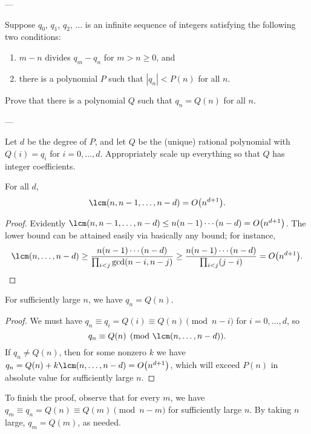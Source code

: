 
---

Suppose $q_0$, $q_1$, $q_2$, $\ldots$ is an infinite sequence of integers satisfying the following two conditions:
\begin{enumerate}[label=(\roman*),itemsep=0em]
    \item $m-n$ divides $q_m-q_n$ for $m>n\ge0$, and
    \item there is a polynomial $P$ such that $|q_n|<P(n)$ for all $n$.
\end{enumerate}
Prove that there is a polynomial $Q$ such that $q_n=Q(n)$ for all $n$.

---

Let $d$ be the degree of $P$, and let $Q$ be the (unique) rational polynomial with $Q(i)=q_i$ for $i=0,\ldots,d$. Appropriately scale up everything so that $Q$ has integer coefficients.
\begin{lemma*}
    For all $d$,
    \[\lcm(n,n-1,\ldots,n-d)=O\big(n^{d+1}\big).\]
\end{lemma*}
\begin{proof}
    Evidently $\lcm(n,n-1,\ldots,n-d)\le n(n-1)\cdots(n-d)=O\big(n^{d+1}\big)$. The lower bound can be attained easily via basically any bound; for instance,
    \[\lcm(n,\ldots,n-d)\ge\frac{n(n-1)\cdots(n-d)}{\prod_{i<j}\gcd(n-i,n-j)}\ge\frac{n(n-1)\cdots(n-d)}{\prod_{i<j}(j-i)}=O\big(n^{d+1}\big).\]
\end{proof}
\begin{claim*}
    For sufficiently large $n$, we have $q_n=Q(n)$.
\end{claim*}
\begin{proof}
    We must have $q_n\equiv q_i=Q(i)\equiv Q(n)\pmod{n-i}$ for $i=0,\ldots,d$, so
    \[q_n\equiv Q(n)\pmod{\lcm(n,\ldots,n-d)}.\]
    If $q_n\ne Q(n)$, then for some nonzero $k$ we have $q_n=Q(n)+k\lcm(n,\ldots,n-d)=O\big(n^{d+1}\big)$, which will exceed $P(n)$ in absolute value for sufficiently large $n$.
\end{proof}

To finish the proof, observe that for every $m$, we have $q_m\equiv q_n=Q(n)\equiv Q(m)\pmod{n-m}$ for sufficiently large $n$. By taking $n$ large, $q_m=Q(m)$, as needed.


